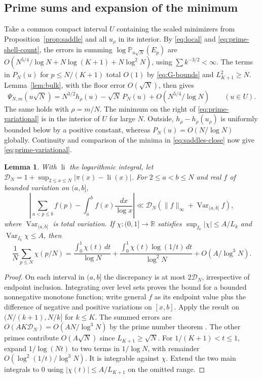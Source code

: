\documentclass[11pt]{amsart}
\newtheorem{lemma}[theorem]{Lemma}
\theoremstyle{remark}
\DeclareMathOperator{\li}{li}
\newcommand{\Pp}{\mathbb P}
\begin{document}
\subsection{Prime sums and expansion of the minimum}

Take a common compact interval \(U\) containing the scaled minimizers from
Proposition~\ref{prop:saddle} and all \(u_\rho\) in its interior.
By \eqref{eq:local} and \eqref{eq:prime-shell-count}, the errors
in summing \(\log\Pp_{u\sqrt N}(E_p)\) are
\(O(N^{5/4}/\log N+N\log(K+1)+N\log^2 N)\), using
\(\sum k^{-3/2}<\infty\). The terms in \(P_N(u)\) for \(p\le N/(K+1)\)
total \(O(1)\) by \eqref{eq:G-bounds} and \(L_{K+1}^2\ge N\).
Lemma~\ref{lem:bulk}, with the floor error \(O(\sqrt N)\), then gives
\begin{equation}\label{eq:saddles-close}
 \Psi_{N,m}(u\sqrt N)=N^{3/2}h_\rho(u)-\sqrt N\, P_N(u)
                              +O(N^{5/4}/\log N)\qquad(u\in U).
\end{equation}
The same holds with \(\rho=m/N\).
The minimum on the right of \eqref{eq:prime-variational} is in
the interior of \(U\) for large \(N\). Outside, \(h_\rho-h_\rho(u_\rho)\)
is uniformly bounded below by a positive constant, whereas
\(P_N(u)=O(N/\log N)\) globally. Continuity and comparison of the minima
in \eqref{eq:saddles-close} now give \eqref{eq:prime-variational}.

\begin{lemma}\label{lem:prime-summation}
With \(\li\) the logarithmic integral, let
\(\mathcal D_N=1+\sup_{2\le x\le N}|\pi(x)-\li(x)|\).
For \(2\le a<b\le N\) and real \(f\) of bounded variation on \((a,b]\),
\[
 \left|\sum_{a<p\le b}f(p)-\int_a^b f(x)\frac{dx}{\log x}\right|
 \ll\mathcal D_N(\|f\|_\infty+\operatorname{Var}_{(a,b]} f),
\]
where \(\operatorname{Var}_{(a,b]}\) is total variation.
If \(\chi:(0,1]\to\mathbb R\) satisfies
\(\sup_{I_k}|\chi|\le A/L_k\) and \(\operatorname{Var}_{I_k}\chi\le A\),
then
\begin{equation}\label{eq:general-prime-expansion}
 \frac1N\sum_{p\le N}\chi(p/N)
  =\frac{\int_0^1\chi(t)\,dt}{\log N}
    +\frac{\int_0^1\chi(t)\log(1/t)\,dt}{\log^2 N}
    +O(A/\log^3 N).
\end{equation}
\end{lemma}
\begin{proof}
On each interval in \((a,b]\) the discrepancy is at most
\(2\mathcal D_N\), irrespective of endpoint inclusion.
Integrating over level sets proves the bound for a bounded
nonnegative monotone function; write general \(f\) as its endpoint
value plus the difference of negative and positive variations on
\([x,b]\). Apply the result on \((N/(k+1),N/k]\) for \(k\le K\).
The summed errors are \(O(AK\mathcal D_N)=O(AN/\log^3 N)\) by the
prime number theorem \cite[(6.14)]{montgomery-vaughan}. The other
primes contribute \(O(A\sqrt N)\) since \(L_{K+1}\ge\sqrt N\).
For \(1/(K+1)<t\le1\), expand \(1/\log(Nt)\) to two terms in
\(1/\log N\), with remainder \(O(\log^2(1/t)/\log^3 N)\).
It is integrable against \(\chi\). Extend the two main integrals to \(0\)
using \(|\chi(t)|\le A/L_{K+1}\) on the omitted range.
\end{proof}
\end{document}
